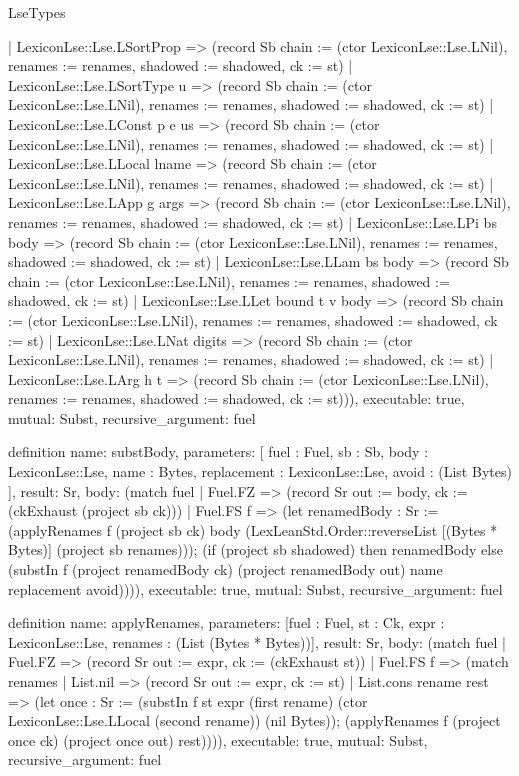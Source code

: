 \begin{lexlean}{LseTypes}
\begin{semanticmodule}
{      | LexiconLse::Lse.LSortProp => (record Sb {chain := (ctor LexiconLse::Lse.LNil), renames := renames, shadowed := shadowed, ck := st})
      | LexiconLse::Lse.LSortType u => (record Sb {chain := (ctor LexiconLse::Lse.LNil), renames := renames, shadowed := shadowed, ck := st})
      | LexiconLse::Lse.LConst p e us => (record Sb {chain := (ctor LexiconLse::Lse.LNil), renames := renames, shadowed := shadowed, ck := st})
      | LexiconLse::Lse.LLocal lname => (record Sb {chain := (ctor LexiconLse::Lse.LNil), renames := renames, shadowed := shadowed, ck := st})
      | LexiconLse::Lse.LApp g args => (record Sb {chain := (ctor LexiconLse::Lse.LNil), renames := renames, shadowed := shadowed, ck := st})
      | LexiconLse::Lse.LPi bs body => (record Sb {chain := (ctor LexiconLse::Lse.LNil), renames := renames, shadowed := shadowed, ck := st})
      | LexiconLse::Lse.LLam bs body => (record Sb {chain := (ctor LexiconLse::Lse.LNil), renames := renames, shadowed := shadowed, ck := st})
      | LexiconLse::Lse.LLet bound t v body => (record Sb {chain := (ctor LexiconLse::Lse.LNil), renames := renames, shadowed := shadowed, ck := st})
      | LexiconLse::Lse.LNat digits => (record Sb {chain := (ctor LexiconLse::Lse.LNil), renames := renames, shadowed := shadowed, ck := st})
      | LexiconLse::Lse.LArg h t => (record Sb {chain := (ctor LexiconLse::Lse.LNil), renames := renames, shadowed := shadowed, ck := st}))),
  executable: true,
  mutual: Subst,
  recursive_argument: fuel
}

definition{
  name: substBody,
  parameters: [
    fuel : Fuel,
    sb : Sb,
    body : LexiconLse::Lse,
    name : Bytes,
    replacement : LexiconLse::Lse,
    avoid : (List Bytes)
  ],
  result: Sr,
  body: (match fuel
    | Fuel.FZ => (record Sr {out := body, ck := (ckExhaust (project sb ck))})
    | Fuel.FS f => (let renamedBody : Sr := (applyRenames f (project sb ck) body (LexLeanStd.Order::reverseList [(Bytes * Bytes)] (project sb renames))); (if (project sb shadowed) then renamedBody else (substIn f (project renamedBody ck) (project renamedBody out) name replacement avoid)))),
  executable: true,
  mutual: Subst,
  recursive_argument: fuel
}

definition{
  name: applyRenames,
  parameters: [fuel : Fuel, st : Ck, expr : LexiconLse::Lse, renames : (List (Bytes * Bytes))],
  result: Sr,
  body: (match fuel
    | Fuel.FZ => (record Sr {out := expr, ck := (ckExhaust st)})
    | Fuel.FS f => (match renames
      | List.nil => (record Sr {out := expr, ck := st})
      | List.cons rename rest => (let once : Sr := (substIn f st expr (first rename) (ctor LexiconLse::Lse.LLocal (second rename)) (nil Bytes)); (applyRenames f (project once ck) (project once out) rest)))),
  executable: true,
  mutual: Subst,
  recursive_argument: fuel
}


\end{semanticmodule}
\end{lexlean}
